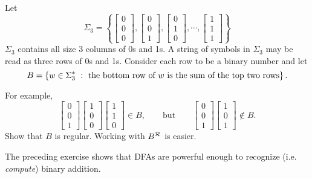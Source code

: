 \documentclass[twoside,letterpaper,openany]{book}
\begin{document}
\begin{exer}
Let
\[
\Sigma_3 = \left\{ \left[\begin{array}{c}0\\0\\0\end{array}\right],
			   \left[\begin{array}{c}0\\0\\1\end{array}\right],
			  \left[\begin{array}{c}0\\1\\0\end{array}\right],
		          \cdots,
		          \left[\begin{array}{c}1\\1\\1\end{array}\right]
		  \right\}
\]
$\Sigma_3$ contains all size 3 columns of 0s and 1s. A string of symbols in $\Sigma_3$ may be read as three rows of 0s and 1s. Consider each row to be a binary number and let
\[
B = \left\lbrace w\in\Sigma_3^{*}\ :\ \textrm{the bottom row of $w$ is the sum of the top two rows} \right\rbrace.
\]

For example,
\[
\left[\begin{array}{c}0\\0\\1\end{array}\right]
\left[\begin{array}{c}1\\0\\0\end{array}\right]
\left[\begin{array}{c}1\\1\\0\end{array}\right]
\in B, \quad \quad \textrm{but} \quad \quad
\left[\begin{array}{c}0\\0\\1\end{array}\right]
\left[\begin{array}{c}1\\0\\1\end{array}\right]
\notin B.
\]
Show that $B$ is regular. 
\hint Working with $B^{\mathcal{R}}$ is easier.
\end{exer}

\begin{discussion}
The preceding exercise shows that DFAs are powerful enough to recognize (i.e. \emph{compute}) binary addition.
\end{discussion}
\end{document}
